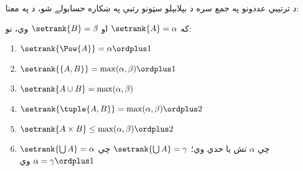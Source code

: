 \documentclass[../../../include/open-logic-section]{subfiles}
\begin{document}

د ترتيبي عددونو په جمع سره د بېلابېلو سټونو رتبې په ښکاره حسابولے شو،
د  په معنا:

\begin{lem}
که $\setrank{A} = \alpha$ او $\setrank{B} = \beta$ وي، نو:
\begin{enumerate}
	\item{} $\setrank{\Pow{A}} = \alpha\ordplus 1$
	\item{} $\setrank{\{A, B\}} = \max(\alpha,
	\beta) \ordplus 1$
	\item{} $\setrank{A \cup B} = \max(\alpha,
	\beta)$
	\item{} $\setrank{\tuple{A,B}} = \max(\alpha,
	\beta) \ordplus  2$
	\item{} $\setrank{A \times B} \leq \max(\alpha,
	\beta) \ordplus  2$
	\item{} $\setrank{\bigcup A} = \alpha$ چې
	$\alpha$ تش يا حدي وي؛ $\setrank{\bigcup A} = \gamma$ چې
	$\alpha = \gamma\ordplus 1$ وي
\end{enumerate}
\end{lem}
\end{document}

